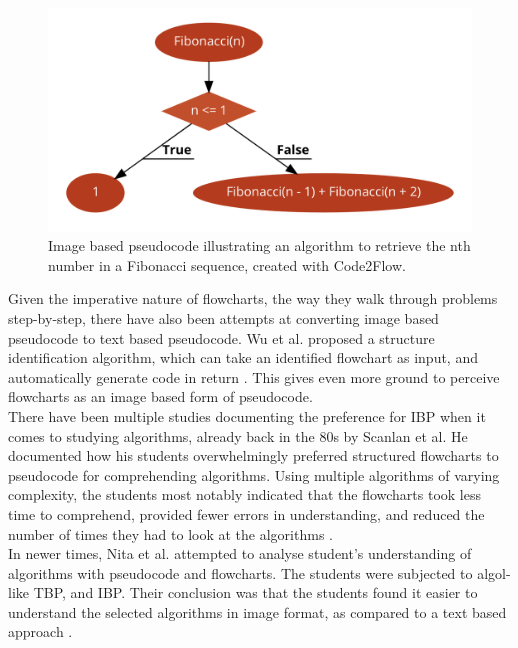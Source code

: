 \begin{figure}[ht]
    \centering
    \includegraphics[scale=0.46]{assets/fibonacci_flowchart.png}
    \caption{Image based pseudocode illustrating an algorithm to retrieve the nth number in a Fibonacci sequence, created with Code2Flow.}
    \label{fig:fibseq1}
\end{figure}

Given the imperative nature of flowcharts, the way they walk through problems step-by-step, there have also been attempts at converting image based pseudocode to text based pseudocode. Wu et al. proposed a structure identification algorithm, which can take an identified flowchart as input, and automatically generate code in return \cite{codeFromFlowcharts}. This gives even more ground to perceive flowcharts as an image based form of pseudocode. \hfill \\

There have been multiple studies documenting the preference for IBP when it comes to studying algorithms, already back in the 80s by Scanlan et al. He documented how his students overwhelmingly preferred structured flowcharts to pseudocode for comprehending algorithms. Using multiple algorithms of varying complexity, the students most notably indicated that the flowcharts took less time to comprehend, provided fewer errors in understanding, and reduced the number of times they had to look at the algorithms \cite{DBLP:journals/software/Scanlan89}. \hfill \\

In newer times, Nita et al. attempted to analyse student's understanding of algorithms with pseudocode and flowcharts. The students were subjected to algol-like TBP, and IBP. Their conclusion was that the students found it easier to understand the selected algorithms in image format, as compared to a text based approach \cite{Nita_2020}.

